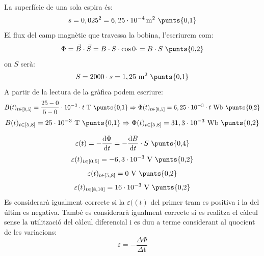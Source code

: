 \begin{solapartat}
La superfície de una sola espira és:
\[ s = 0,025^2 = 6,25\cdot 10^{-4}\,\mathrm{m^2}\ \text{\punts{0,1}} \]
El flux del camp magnètic que travessa la bobina, l'escriurem com:
\[ \Phi = \vec{B}\cdot\vec{S} = B\cdot S\cdot\cos 0\cdot = B\cdot S\ \text{\punts{0,2}} \]
on $S$ serà:
\[ S = 2000\cdot s = 1,25\ \mathrm{m^2}\ \text{\punts{0,1}} \]
A partir de la lectura de la gràfica podem escriure:
\[ B(t)_{t\in[0, 5]} = \frac{25 - 0}{5 - 0}\cdot 10^{-3}\cdot t\ \mathrm{T}\ \text{\punts{0,1}} \Rightarrow \Phi(t)_{t\in[0, 5]} = 6,25\cdot 10^{-3}\cdot t\ \mathrm{Wb}\ \text{\punts{0,2}} \]
\[ B(t)_{t\in[5, 8]} = 25\cdot 10^{-3}\ \mathrm{T}\ \text{\punts{0,1}} \Rightarrow \Phi(t)_{t\in[5, 8]} = 31,3\cdot 10^{-3}\ \mathrm{Wb}\ \text{\punts{0,2}} \]
\end{solapartat}

\begin{solapartat}
\[ \varepsilon(t) = -\frac{\mathrm{d}\Phi}{\mathrm{d}t} = -\frac{\mathrm{d}B}{\mathrm{d}t}\cdot S\ \text{\punts{0,4}} \]
\[ \varepsilon(t)_{t\in[0, 5]} = -6,3\cdot 10^{-3}\ \mathrm{V}\ \text{\punts{0,2}} \]
\[ \varepsilon(t)_{t\in[5, 8]} = 0\ \mathrm{V}\ \text{\punts{0,2}} \]
\[ \varepsilon(t)_{t\in[8, 10]} = 16\cdot 10^{-3}\ \mathrm{V}\ \text{\punts{0,2}} \]
Es considerarà igualment correcte si la $\varepsilon((t)$ del primer tram es positiva i la del últim es negativa. També es considerarà igualment correcte si es realitza el càlcul sense la utilització del càlcul diferencial i es duu a terme considerant al quocient de les variacions:
\[ \varepsilon = -\frac{\Delta\Phi}{\Delta\mathrm{t}} \]
\end{solapartat}
